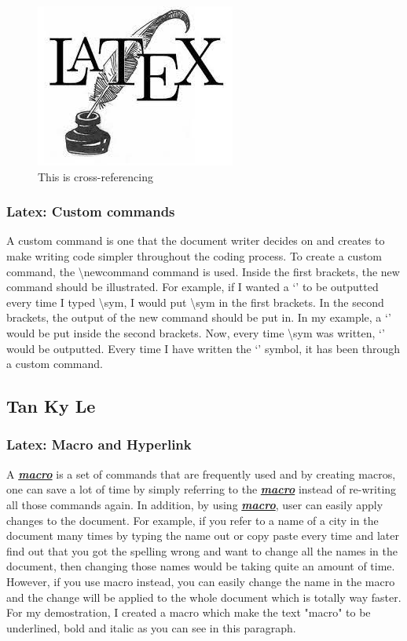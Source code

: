 \documentclass[a4paper, 11pt]{report}
\begin{document}
\begin{figure}[h]
\centering
\includegraphics{latex.jpg}
\caption{This is cross-referencing}
\label{example}
\end{figure}

\subsubsection{Latex: Custom commands}
\newcommand{\sym}{
{`'}
}
A custom command is one that the document writer decides on and creates to make writing code simpler throughout the coding process. To create a custom command, the \textbackslash newcommand{}{} command is used. Inside the first brackets, the new command should be illustrated. For example, if I wanted a \sym to be outputted every time I typed \textbackslash sym, I would put \textbackslash sym in the first brackets. In the second brackets, the output of the new command should be put in. In my example, a \sym would be put inside the second brackets. Now, every time \textbackslash sym was written, \sym would be outputted. Every time I have written the \sym symbol, it has been through a custom command.\cite{jake12}

\subsection{Tan Ky Le}

\subsubsection{ Latex: Macro and Hyperlink}
\newcommand{\BoldandItalic}[0]{\textbf{\textit{ \underline{macro}}}}

A\BoldandItalic{} is a set of commands that are frequently used and by creating macros, one can save a lot of time by simply referring to the\BoldandItalic{} instead of re-writing all those commands again. In addition, by using\BoldandItalic{}, user can easily apply changes to the document. For example, if you refer to a name of a city in the document many times by typing the name out or copy paste every time and later find out that you got the spelling wrong and want to change all the names in the document, then changing those names would be taking quite an amount of time. However, if you use macro instead, you can easily change the name in the macro and the change will be applied to the whole document which is totally way faster. For my demostration, I created a macro which make the text "macro" to be underlined, bold and italic  as you can see in this paragraph.
\end{document}

